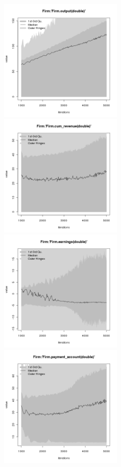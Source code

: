 \begin{figure}[H!]
\centering\leavevmode
\begin{minipage}{14cm}
\centering\leavevmode
\includegraphics[width=6cm]{./png/tax_0.10/Firm-output.png}
\includegraphics[width=6cm]{./png/tax_0.10/Firm-cum_revenue.png}\\
\includegraphics[width=6cm]{./png/tax_0.10/Firm-earnings.png}
\includegraphics[width=6cm]{./png/tax_0.10/Firm-payment_account.png}\\

\end{minipage}
\end{figure}
